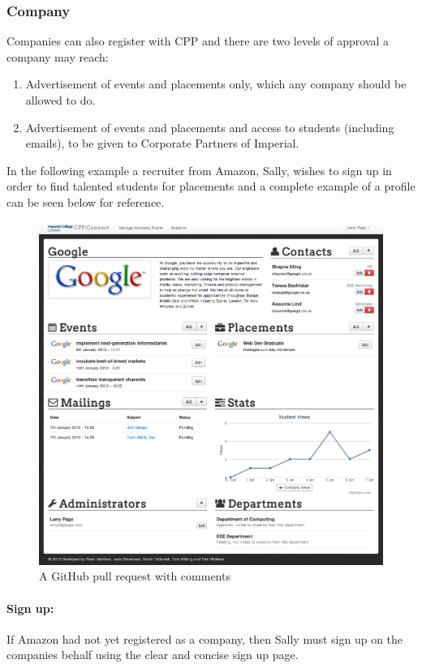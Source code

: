 \subsubsection{Company}
Companies can also register with CPP and there are two levels of approval a company may reach:
  \begin{enumerate}
    \item Advertisement of events and placements only, which any company should be allowed to do.
    \item Advertisement of events and placements and access to students (including emails), to be given to Corporate Partners of Imperial.
  \end{enumerate}
  In the following example a recruiter from Amazon, Sally, wishes to sign up in order to find talented students for placements and a complete example of a profile can be seen below for reference.
  \begin{figure}[H]\centering
  \includegraphics[scale=0.5]{images/user_experiences/company/complete_company_profile}
  \caption{A GitHub pull request with comments}
  \end{figure}


  \paragraph{Sign up:}  
    If Amazon had not yet registered as a company, then Sally must sign up on the companies behalf using the clear and concise sign up page.


